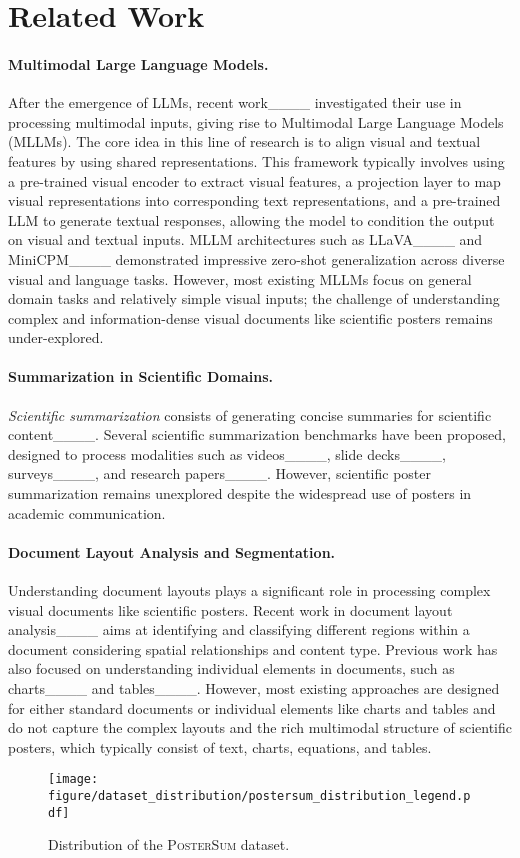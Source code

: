 \section{Related Work}
\paragraph{Multimodal Large Language Models.}
%
After the emergence of LLMs, recent work____ investigated their use in processing multimodal inputs, giving rise to Multimodal Large Language Models (MLLMs).
%
The core idea in this line of research is to align visual and textual features by using shared representations.
%
This framework typically involves using a pre-trained visual encoder to extract visual features, a projection layer to map visual representations into corresponding text representations, and a pre-trained LLM to generate textual responses, allowing the model to condition the output on visual and textual inputs.
%
MLLM architectures such as LLaVA____ and MiniCPM____ demonstrated impressive zero-shot generalization across diverse visual and language tasks.
%
However, most existing MLLMs focus on general domain tasks and relatively simple visual inputs; the challenge of understanding complex and information-dense visual documents like scientific posters remains under-explored.
%

%
\paragraph{Summarization in Scientific Domains.}
%
\emph{Scientific summarization} consists of generating concise summaries for scientific content____.
%
Several scientific summarization benchmarks have been proposed, %
designed to process modalities such as videos____, slide decks____, surveys____, 
and research papers____. 
%
However, scientific poster summarization remains unexplored despite the widespread use of posters in academic communication.

%
\paragraph{Document Layout Analysis and Segmentation.}
%
Understanding document layouts plays a significant role in processing complex visual documents like scientific posters.
%
Recent work in document layout analysis____ aims at identifying and classifying different regions within a document considering spatial relationships and content type.
%
Previous work has also focused on understanding individual elements in documents, such as charts____ and tables____.
% 
However, most existing approaches are designed for either standard documents or individual elements like charts and tables and do not capture the complex layouts and the rich multimodal structure of scientific posters, which typically consist of text, charts, equations, and tables.
%

\begin{figure}[t]
  \centering
  \vspace{-2ex}
\texttt{[image: figure/dataset\_distribution/postersum\_distribution\_legend.pdf]}
\vspace{-2ex}
  \caption{Distribution of the \textsc{PosterSum} dataset.}
  \label{fig:year_dist}
\end{figure}
%